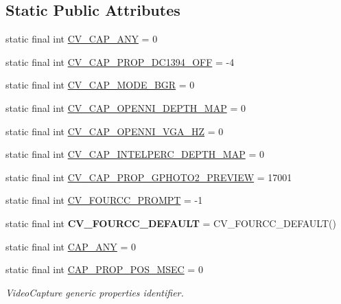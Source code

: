 \subsection*{Static Public Attributes}
\begin{DoxyCompactItemize}
\item 
static final int \hyperlink{group__videoio__c_gab170df7f9f17e64c3642fbc2036c9d89}{C\+V\+\_\+\+C\+A\+P\+\_\+\+A\+NY} = 0
\item 
static final int \hyperlink{group__videoio__c_gab93e06d5b7823b93b958bffc1d6c5220}{C\+V\+\_\+\+C\+A\+P\+\_\+\+P\+R\+O\+P\+\_\+\+D\+C1394\+\_\+\+O\+FF} = -\/4
\item 
static final int \hyperlink{group__videoio__c_ga857b3fa265775f5d402c1e0a65ef254d}{C\+V\+\_\+\+C\+A\+P\+\_\+\+M\+O\+D\+E\+\_\+\+B\+GR} = 0
\item 
static final int \hyperlink{group__videoio__c_ga0614006f7159a4f38a5536d9afc6c841}{C\+V\+\_\+\+C\+A\+P\+\_\+\+O\+P\+E\+N\+N\+I\+\_\+\+D\+E\+P\+T\+H\+\_\+\+M\+AP} = 0
\item 
static final int \hyperlink{group__videoio__c_ga21913880c4cae25d1ff392c5fa2bb30f}{C\+V\+\_\+\+C\+A\+P\+\_\+\+O\+P\+E\+N\+N\+I\+\_\+\+V\+G\+A\+\_\+HZ} = 0
\item 
static final int \hyperlink{group__videoio__c_ga24a1e5be05c39075c7d1f8564521f733}{C\+V\+\_\+\+C\+A\+P\+\_\+\+I\+N\+T\+E\+L\+P\+E\+R\+C\+\_\+\+D\+E\+P\+T\+H\+\_\+\+M\+AP} = 0
\item 
static final int \hyperlink{group__videoio__c_ga6e1f35a3b8dc5ab0fc4b7363821533d8}{C\+V\+\_\+\+C\+A\+P\+\_\+\+P\+R\+O\+P\+\_\+\+G\+P\+H\+O\+T\+O2\+\_\+\+P\+R\+E\+V\+I\+EW} = 17001
\item 
static final int \hyperlink{group__videoio__c_gaa801d0075e64846c5f858fafb7f7ba26}{C\+V\+\_\+\+F\+O\+U\+R\+C\+C\+\_\+\+P\+R\+O\+M\+PT} = -\/1
\item 
static final int {\bfseries C\+V\+\_\+\+F\+O\+U\+R\+C\+C\+\_\+\+D\+E\+F\+A\+U\+LT} = C\+V\+\_\+\+F\+O\+U\+R\+C\+C\+\_\+\+D\+E\+F\+A\+U\+LT()
\item 
static final int \hyperlink{group__videoio__flags__base_ga5919f622200581e7cc68b521cd528f3f}{C\+A\+P\+\_\+\+A\+NY} = 0
\item 
static final int \hyperlink{group__videoio__flags__base_ga0d261205f5852e23c0987e9a838e9f91}{C\+A\+P\+\_\+\+P\+R\+O\+P\+\_\+\+P\+O\+S\+\_\+\+M\+S\+EC} = 0
\begin{DoxyCompactList}\small\item\em Video\+Capture generic properties identifier. \end{DoxyCompactList}\item 

\end{DoxyCompactItemize}
